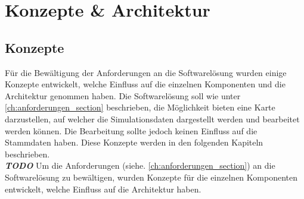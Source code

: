 \chapter{Konzepte \& Architektur}
\label{ch:konzepte_architektur}
\section{Konzepte}
Für die Bewältigung der Anforderungen an die Softwarelösung wurden einige Konzepte entwickelt, welche Einfluss auf die einzelnen Komponenten und die Architektur genommen haben. Die Softwarelösung soll wie unter \ref{ch:anforderungen_section}  beschrieben, die Möglichkeit bieten eine Karte darzustellen, auf welcher die Simulationsdaten dargestellt werden und bearbeitet werden können. Die Bearbeitung sollte jedoch keinen Einfluss auf die Stammdaten haben. Diese Konzepte werden in den folgenden Kapiteln beschrieben.\\
\textbf{\textit{TODO}}
Um die Anforderungen (siehe. \ref{ch:anforderungen_section}) an die Softwarelösung zu bewältigen, wurden Konzepte für die einzelnen Komponenten entwickelt, welche Einfluss auf die Architektur haben.
